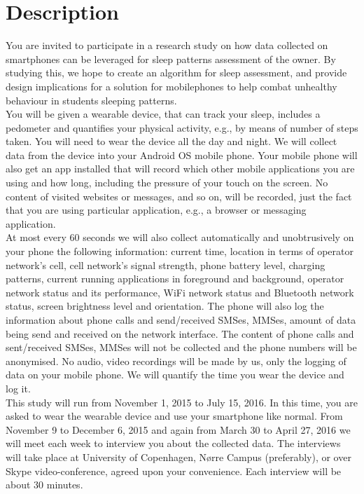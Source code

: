 \documentclass[12pt]{article}
\begin{document}


\newpage

\section{Description}
You are invited to participate in a research study on how data collected on smartphones can be leveraged for sleep patterns assessment of the owner. By studying this, we hope to create an algorithm for sleep assessment, and provide design implications for a solution for mobilephones to help combat unhealthy behaviour in students sleeping patterns. \\

You will be given a wearable device, that can track your sleep, includes a pedometer and quantifies your physical activity, e.g., by means of number of steps taken. You will need to wear the device all the day and night. We will collect data from the device into your Android OS mobile phone. Your mobile phone will also get an app installed that will record which other mobile applications you are using and how long, including the pressure of your touch on the screen. No content of visited websites or messages, and so on, will be recorded, just the fact that you are using particular application, e.g., a browser or messaging application. \\

At most every 60 seconds we will also collect automatically and unobtrusively on your phone the following information: current time, location in terms of operator network's cell, cell network's signal strength, phone battery level, charging patterns, current running applications in foreground and background, operator network status and its performance, WiFi network status and Bluetooth network status, screen brightness level and orientation. The phone will also log the information about phone calls and send/received SMSes, MMSes, amount of data being send and received on the network interface. The content of phone calls and sent/received SMSes, MMSes will not be collected and the phone numbers will be anonymised. No audio, video recordings will be made by us, only the logging of data on your mobile phone. We will quantify the time you wear the device and log it.\\

This study will run from November 1, 2015 to July 15, 2016. In this time, you are asked to wear the wearable device and use your smartphone like normal. From November 9 to December 6, 2015 and again from March 30 to April 27, 2016 we will meet each week to interview you about the collected data. The interviews will take place at University of Copenhagen, Nørre Campus (preferably), or over Skype video-conference, agreed upon your convenience. Each interview will be about 30 minutes. \\
\end{document}
